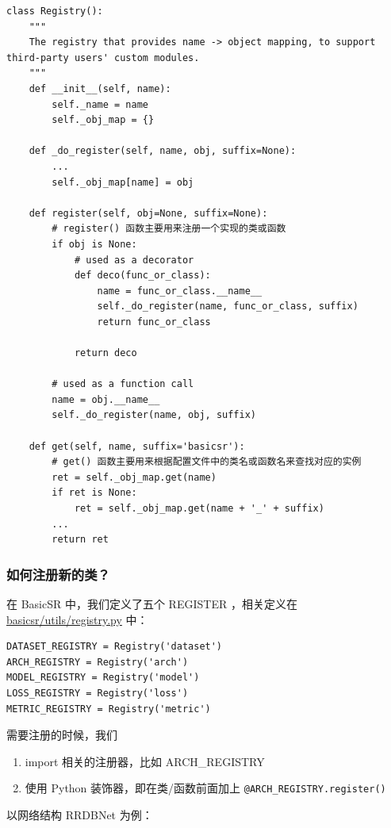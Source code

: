 \documentclass[../main.tex]{subfiles}
\begin{document}
\begin{verbatim}
class Registry():
    """
    The registry that provides name -> object mapping, to support third-party users' custom modules.
    """
    def __init__(self, name):
        self._name = name
        self._obj_map = {}

    def _do_register(self, name, obj, suffix=None):
        ...
        self._obj_map[name] = obj

    def register(self, obj=None, suffix=None):
        # register() 函数主要用来注册一个实现的类或函数
        if obj is None:
            # used as a decorator
            def deco(func_or_class):
                name = func_or_class.__name__
                self._do_register(name, func_or_class, suffix)
                return func_or_class

            return deco

        # used as a function call
        name = obj.__name__
        self._do_register(name, obj, suffix)

    def get(self, name, suffix='basicsr'):
        # get() 函数主要用来根据配置文件中的类名或函数名来查找对应的实例
        ret = self._obj_map.get(name)
        if ret is None:
            ret = self._obj_map.get(name + '_' + suffix)
        ...
        return ret
\end{verbatim}

\subsubsection{如何注册新的类？}\label{code_structure:how_to_register}

在 BasicSR 中，我们定义了五个 REGISTER ，相关定义在 \href{https://github.com/XPixelGroup/BasicSR/blob/master/basicsr/utils/registry.py}{basicsr/utils/registry.py} 中：
\begin{verbatim}
DATASET_REGISTRY = Registry('dataset')
ARCH_REGISTRY = Registry('arch')
MODEL_REGISTRY = Registry('model')
LOSS_REGISTRY = Registry('loss')
METRIC_REGISTRY = Registry('metric')
\end{verbatim}

需要注册的时候，我们
\begin{enumerate}
    \item import 相关的注册器，比如 ARCH\_REGISTRY
    \item 使用 Python 装饰器，即在类/函数前面加上 \texttt{@ARCH\_REGISTRY.register()}
\end{enumerate}
以网络结构 RRDBNet 为例：
\end{document}
